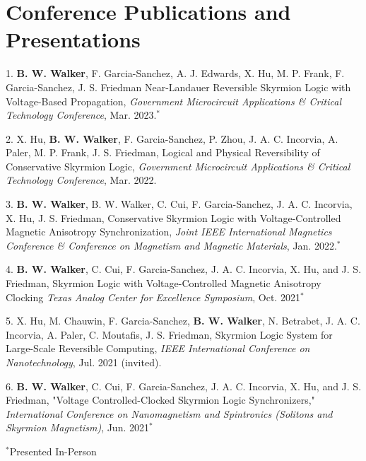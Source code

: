 \documentclass[letterpaper,11pt]{article}
\begin{document}
\section{Conference Publications and Presentations}
    \begin{itemize}[leftmargin=0.15in, label={}]
        \small{\item{
         1.\textbf{\hspace{3pt} B. W. Walker}, F. Garcia-Sanchez, A. J. Edwards, X. Hu, M. P. Frank, F. Garcia-Sanchez, J. S. Friedman Near-Landauer Reversible Skyrmion Logic with Voltage-Based Propagation, \textit{Government Microcircuit Applications \& Critical Technology Conference}, Mar. 2023.$^{*}$
         }}
        \small{\item{
         2.\hspace{3pt} X. Hu, \textbf{B. W. Walker}, F. Garcia-Sanchez, P. Zhou, J. A. C. Incorvia, A. Paler, M. P. Frank, J. S. Friedman, Logical and Physical Reversibility of Conservative Skyrmion Logic, \textit{Government Microcircuit Applications \& Critical Technology Conference}, Mar. 2022.
         }}
         \small{\item{
         3.\textbf{\hspace{3pt} B. W. Walker}, B. W. Walker, C. Cui, F. Garcia-Sanchez, J. A. C. Incorvia, X. Hu, J. S. Friedman, Conservative Skyrmion Logic with Voltage-Controlled Magnetic Anisotropy Synchronization, \textit{Joint IEEE International Magnetics Conference \& Conference on Magnetism and Magnetic Materials}, Jan. 2022.$^{*}$
        }}
        \small{\item{
         4.\textbf{\hspace{3pt} B. W. Walker}{, C. Cui, F. Garcia-Sanchez, J. A. C. Incorvia, X. Hu, and J. S. Friedman, Skyrmion Logic with Voltage-Controlled Magnetic Anisotropy Clocking \textit{Texas Analog Center for Excellence Symposium}, Oct. 2021}$^{*}$
        }}
        \small{\item{
         5.\hspace{3pt} X. Hu, M. Chauwin, F. Garcia-Sanchez, \textbf{B. W. Walker}, N. Betrabet, J. A. C. Incorvia, A. Paler, C. Moutafis, J. S. Friedman, Skyrmion Logic System for Large-Scale Reversible Computing, \textit{IEEE International Conference on Nanotechnology}, Jul. 2021 (invited).
        }}
        \small{\item{
         6.\textbf{\hspace{3pt} B. W. Walker}{, C. Cui, F. Garcia-Sanchez, J. A. C. Incorvia, X. Hu, and J. S. Friedman, "Voltage Controlled-Clocked Skyrmion Logic Synchronizers," \textit{International Conference on Nanomagnetism and Spintronics (Solitons and Skyrmion Magnetism)}, Jun. 2021}$^{*}$
        }}
     \end{itemize}
     \vspace{-15pt}\hspace{400pt}$^{*}$Presented In-Person\vspace{-15pt}
\end{document}
